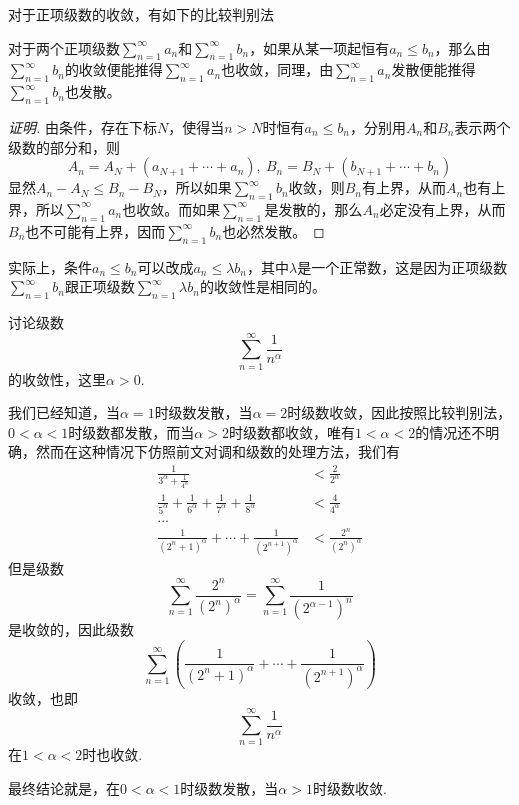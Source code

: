 对于正项级数的收敛，有如下的比较判别法
\begin{theorem}[比较判别法]
  \label{theorem:comparison-method-about-series-converage}
  对于两个正项级数$\sum_{n=1}^{\infty}a_n$和$\sum_{n=1}^{\infty}b_n$，如果从某一项起恒有$a_n \leqslant b_n$，那么由$\sum_{n=1}^{\infty}b_n$的收敛便能推得$\sum_{n=1}^{\infty}a_n$也收敛，同理，由$\sum_{n=1}^{\infty}a_n$发散便能推得$\sum_{n=1}^{\infty}b_n$也发散。
\end{theorem}

\begin{proof}[证明]
  由条件，存在下标$N$，使得当$n>N$时恒有$a_n \leqslant b_n$，分别用$A_n$和$B_n$表示两个级数的部分和，则
  \[ A_n = A_N + (a_{N+1}+\cdots+a_n), \  B_n=B_N+(b_{N+1}+\cdots+b_n) \]
  显然$A_n - A_N \leqslant B_n-B_N$，所以如果$\sum_{n=1}^{\infty}b_n$收敛，则$B_n$有上界，从而$A_n$也有上界，所以$\sum_{n=1}^{\infty}a_n$也收敛。而如果$\sum_{n=1}^{\infty}$是发散的，那么$A_n$必定没有上界，从而$B_n$也不可能有上界，因而$\sum_{n=1}^{\infty}b_n$也必然发散。
\end{proof}

实际上，条件$a_n \leqslant b_n$可以改成$a_n \leqslant \lambda b_n$，其中$\lambda$是一个正常数，这是因为正项级数$\sum_{n=1}^{\infty}b_n$跟正项级数$\sum_{n=1}^{\infty}\lambda b_n$的收敛性是相同的。


\begin{example}
  讨论级数
  \[ \sum_{n=1}^{\infty}\frac{1}{n^{\alpha}} \]
  的收敛性，这里$\alpha>0$.

  我们已经知道，当$\alpha=1$时级数发散，当$\alpha=2$时级数收敛，因此按照比较判别法，$0<\alpha<1$时级数都发散，而当$\alpha>2$时级数都收敛，唯有$1<\alpha<2$的情况还不明确，然而在这种情况下仿照前文对调和级数的处理方法，我们有
  \begin{align*}
    \frac{1}{3^{\alpha}+\frac{1}{4^{\alpha}}} & < \frac{2}{2^{\alpha}} \\
    \frac{1}{5^{\alpha}}+\frac{1}{6^{\alpha}}+\frac{1}{7^{\alpha}}+\frac{1}{8^{\alpha}} & < \frac{4}{4^{\alpha}} \\
     ... & \\
    \frac{1}{(2^n+1)^{\alpha}}+\cdots+\frac{1}{(2^{n+1})^{\alpha}} & < \frac{2^n}{(2^n)^{\alpha}}
  \end{align*}
  但是级数
  \[ \sum_{n=1}^{\infty} \frac{2^n}{(2^n)^{\alpha}} = \sum_{n=1}^{\infty} \frac{1}{(2^{\alpha-1})^n} \]
  是收敛的，因此级数
  \[ \sum_{n=1}^{\infty} \left( \frac{1}{(2^n+1)^{\alpha}}+\cdots+\frac{1}{(2^{n+1})^{\alpha}} \right) \]
  收敛，也即
  \[ \sum_{n=1}^{\infty}\frac{1}{n^{\alpha}} \]
  在$1<\alpha<2$时也收敛.

  最终结论就是，在$0<\alpha<1$时级数发散，当$\alpha>1$时级数收敛.
\end{example}




